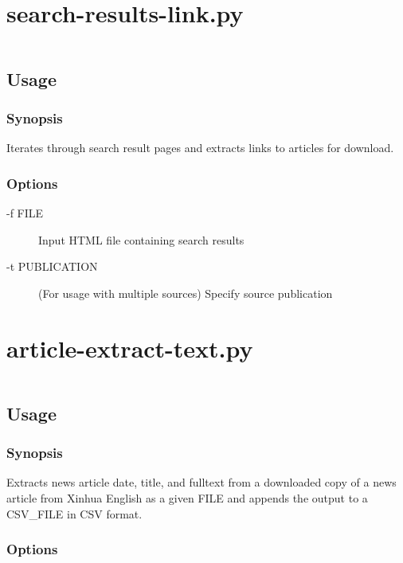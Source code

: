 \appendix

\chapter{search-results-link.py}

\inputminted[linenos]{python}{../search-results-link.py}

\section{Usage}

\subsection{Synopsis}

Iterates through search result pages and extracts links to articles for
download.

\subsection{Options}

\begin{description}
	\item [-f FILE] Input HTML file containing search results
	\item [-t PUBLICATION] (For usage with multiple sources)
	Specify source publication
\end{description}

\chapter{article-extract-text.py}\label{adx:python-script}

\inputminted[linenos]{python}{../article-extract-text.py}

\section{Usage}

\subsection{Synopsis}

Extracts news article date, title, and fulltext from a downloaded copy
of a news article from Xinhua English as a given FILE and appends the
output to a CSV\_FILE in CSV format.

\subsection{Options}

